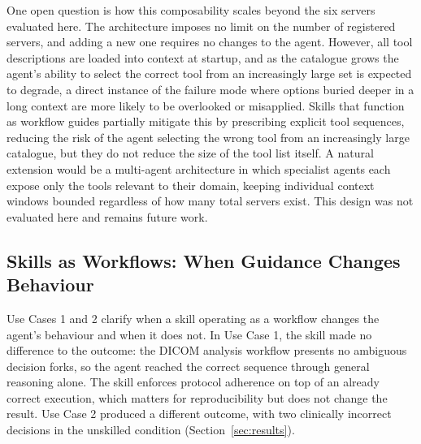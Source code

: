 \documentclass[conference]{IEEEtran}
\begin{document}
One open question is how this composability scales beyond the six servers evaluated here. The architecture imposes no limit on the number of registered servers, and adding a new one requires no changes to the agent. However, all tool descriptions are loaded into context at startup, and as the catalogue grows the agent's ability to select the correct tool from an increasingly large set is expected to degrade, a direct instance of the failure mode where options buried deeper in a long context are more likely to be overlooked or misapplied. Skills that function as workflow guides partially mitigate this by prescribing explicit tool sequences, reducing the risk of the agent selecting the wrong tool from an increasingly large catalogue, but they do not reduce the size of the tool list itself. A natural extension would be a multi-agent architecture in which specialist agents each expose only the tools relevant to their domain, keeping individual context windows bounded regardless of how many total servers exist. This design was not evaluated here and remains future work.

\subsection{Skills as Workflows: When Guidance Changes Behaviour}

Use Cases 1 and 2 clarify when a skill operating as a workflow changes the agent's behaviour and when it does not. In Use Case 1, the skill made no difference to the outcome: the DICOM analysis workflow presents no ambiguous decision forks, so the agent reached the correct sequence through general reasoning alone. The skill enforces protocol adherence on top of an already correct execution, which matters for reproducibility but does not change the result. Use Case 2 produced a different outcome, with two clinically incorrect decisions in the unskilled condition (Section~\ref{sec:results}).
\end{document}

